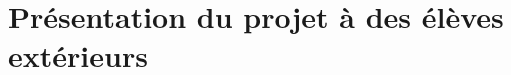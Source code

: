 \section{Présentation du projet à des élèves extérieurs}
\label{sec:Présentation du projet à des élèves extérieurs}
\pagebreak
